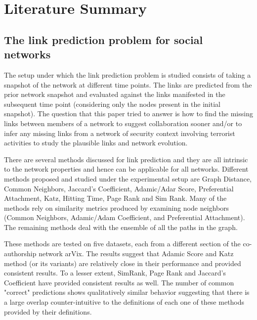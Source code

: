 \documentclass[11pt]{article}
\begin{document}
\section{Literature Summary}
\subsection{The link prediction problem for social networks \cite{nowellklein}}
The setup under which the link prediction problem is studied consists of taking a snapshot of the network at different time points. The links are predicted from the prior network snapshot and evaluated against the links manifested in the subsequent time point (considering only the nodes present in the initial snapshot). The question that this paper tried to answer is how to find the missing links between members of a network to suggest collaboration sooner and/or to infer any missing links from a network of security context involving terrorist activities to study the plausible links and network evolution.\\
\par
There are several methods discussed for link prediction and they are all intrinsic to the network properties and hence can be applicable for all networks. Different methods proposed and studied under the experimental setup are Graph Distance, Common Neighbors, Jaccard's Coefficient, Adamic/Adar Score, Preferential Attachment, Katz, Hitting Time, Page Rank and Sim Rank. Many of the methods rely on similarity metrics produced by examining node neighbors (Common Neighbors, Adamic/Adam Coefficient, and Preferential Attachment). The remaining methods deal with the ensemble of all the paths in the graph.\\
\par
These methods are tested on five datasets, each from a different section of the co-authorship network arVix. The results suggest that Adamic Score and Katz method (or its variants) are relatively close in their performance and provided consistent results. To a lesser extent, SimRank, Page Rank and Jaccard's Coefficient have provided consistent results as well. The number of common "correct" predictions shows qualitatively similar behavior suggesting that there is a large overlap counter-intuitive to the definitions of each one of these methods provided by their definitions.\\
\par
\end{document}
